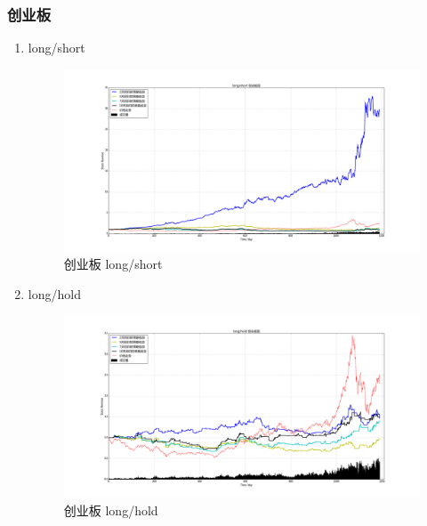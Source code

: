 \documentclass[12pt,a4paper]{article}
\begin{document}
\subsubsection{创业板}
\begin{enumerate}
\item long/short 
\begin{figure}[H]
	\centering
	\includegraphics[width=1.0\textwidth]{img_r_1/cyb.png}
	\caption{创业板 long/short}
\end{figure}
\item long/hold 
\begin{figure}[H]
	\centering
	\includegraphics[width=1.0\textwidth]{img_r_2/cyb_1.png}
	\caption{创业板 long/hold }
\end{figure}
\end{enumerate}
\end{document}
